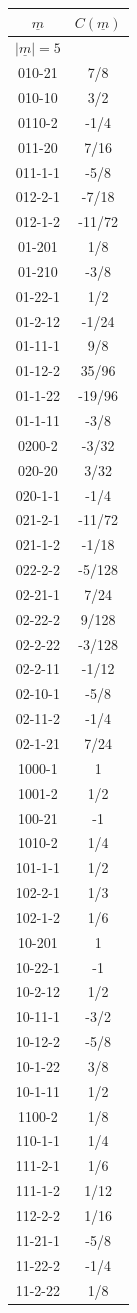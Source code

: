 \begin{tabular}[t]{|cc|}
\hline
$\underline{m}$ & $C(\underline{m})$\\
\hline\hline
$|\underline{m}|=5$&\\
\hline
010-21 &  7/8\\
010-10 &  3/2\\
0110-2 &  -1/4\\
011-20 &  7/16\\
011-1-1 &  -5/8\\
012-2-1 &  -7/18\\
012-1-2 &  -11/72\\
01-201 &  1/8\\
01-210 &  -3/8\\
01-22-1 &  1/2\\
01-2-12 &  -1/24\\
01-11-1 &  9/8\\
01-12-2 &  35/96\\
01-1-22 &  -19/96\\
01-1-11 &  -3/8\\
0200-2 &  -3/32\\
020-20 &  3/32\\
020-1-1 &  -1/4\\
021-2-1 &  -11/72\\
021-1-2 &  -1/18\\
022-2-2 &  -5/128\\
02-21-1 &  7/24\\
02-22-2 &  9/128\\
02-2-22 &  -3/128\\
02-2-11 &  -1/12\\
02-10-1 &  -5/8\\
02-11-2 &  -1/4\\
02-1-21 &  7/24\\
1000-1 &  1\\
1001-2 &  1/2\\
100-21 &  -1\\
1010-2 &  1/4\\
101-1-1 &  1/2\\
102-2-1 &  1/3\\
102-1-2 &  1/6\\
10-201 &  1\\
10-22-1 &  -1\\
10-2-12 &  1/2\\
10-11-1 &  -3/2\\
10-12-2 &  -5/8\\
10-1-22 &  3/8\\
10-1-11 &  1/2\\
1100-2 &  1/8\\
110-1-1 &  1/4\\
111-2-1 &  1/6\\
111-1-2 &  1/12\\
112-2-2 &  1/16\\
11-21-1 &  -5/8\\
11-22-2 &  -1/4\\
11-2-22 &  1/8\\
\hline
\end{tabular}
